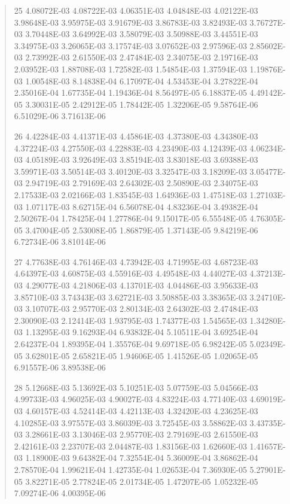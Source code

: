 \documentclass[letterpaper,10pt,english]{sphinxmanual}
\begin{document}
\begin{quote}
\begin{DUlineblock}{0em}
\item[] 25   4.08072E-03  4.08722E-03  4.06351E-03  4.04848E-03  4.02122E-03  3.98648E-03  3.95975E-03  3.91679E-03  3.86783E-03  3.82493E-03  3.76727E-03  3.70448E-03  3.64992E-03  3.58079E-03  3.50988E-03  3.44551E-03  3.34975E-03  3.26065E-03  3.17574E-03  3.07652E-03  2.97596E-03  2.85602E-03  2.73992E-03  2.61550E-03  2.47484E-03  2.34075E-03  2.19716E-03  2.03952E-03  1.88708E-03  1.72582E-03  1.54854E-03  1.37594E-03  1.19876E-03  1.00548E-03  8.14838E-04  6.17097E-04  4.53453E-04  3.27822E-04  2.35016E-04  1.67735E-04  1.19436E-04  8.56497E-05  6.18837E-05  4.49142E-05  3.30031E-05  2.42912E-05  1.78442E-05  1.32206E-05  9.58764E-06  6.51029E-06  3.71613E-06
\item[] 26   4.42284E-03  4.41371E-03  4.45864E-03  4.37380E-03  4.34380E-03  4.37224E-03  4.27550E-03  4.22883E-03  4.23490E-03  4.12439E-03  4.06234E-03  4.05189E-03  3.92649E-03  3.85194E-03  3.83018E-03  3.69388E-03  3.59971E-03  3.50514E-03  3.40120E-03  3.32547E-03  3.18209E-03  3.05477E-03  2.94719E-03  2.79169E-03  2.64302E-03  2.50890E-03  2.34075E-03  2.17533E-03  2.02166E-03  1.83545E-03  1.64936E-03  1.47518E-03  1.27103E-03  1.07117E-03  8.62715E-04  6.56078E-04  4.83236E-04  3.49382E-04  2.50267E-04  1.78425E-04  1.27786E-04  9.15017E-05  6.55548E-05  4.76305E-05  3.47004E-05  2.53008E-05  1.86879E-05  1.37143E-05  9.84219E-06  6.72734E-06  3.81014E-06
\item[] 27   4.77638E-03  4.76146E-03  4.73942E-03  4.71995E-03  4.68723E-03  4.64397E-03  4.60875E-03  4.55916E-03  4.49548E-03  4.44027E-03  4.37213E-03  4.29077E-03  4.21806E-03  4.13701E-03  4.04486E-03  3.95633E-03  3.85710E-03  3.74343E-03  3.62721E-03  3.50885E-03  3.38365E-03  3.24710E-03  3.10707E-03  2.95770E-03  2.80134E-03  2.64302E-03  2.47484E-03  2.30090E-03  2.12414E-03  1.93795E-03  1.74377E-03  1.54565E-03  1.34280E-03  1.13295E-03  9.16293E-04  6.93832E-04  5.10511E-04  3.69254E-04  2.64237E-04  1.89395E-04  1.35576E-04  9.69718E-05  6.98242E-05  5.02349E-05  3.62801E-05  2.65821E-05  1.94606E-05  1.41526E-05  1.02065E-05  6.91557E-06  3.89538E-06
\item[] 28   5.12668E-03  5.13692E-03  5.10251E-03  5.07759E-03  5.04566E-03  4.99733E-03  4.96025E-03  4.90027E-03  4.83224E-03  4.77140E-03  4.69019E-03  4.60157E-03  4.52414E-03  4.42113E-03  4.32420E-03  4.23625E-03  4.10285E-03  3.97557E-03  3.86039E-03  3.72545E-03  3.58862E-03  3.43735E-03  3.28661E-03  3.13046E-03  2.95770E-03  2.79169E-03  2.61550E-03  2.42161E-03  2.23707E-03  2.04487E-03  1.83156E-03  1.62660E-03  1.41657E-03  1.18900E-03  9.64382E-04  7.32554E-04  5.36009E-04  3.86862E-04  2.78570E-04  1.99621E-04  1.42735E-04  1.02653E-04  7.36930E-05  5.27901E-05  3.82271E-05  2.77824E-05  2.01734E-05  1.47207E-05  1.05232E-05  7.09274E-06  4.00395E-06

\end{DUlineblock}
\end{quote}
\end{document}
